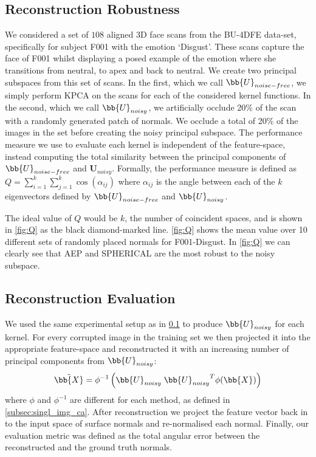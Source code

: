 \subsection{Reconstruction Robustness}\label{subsec:Q}
We considered a set of $108$ aligned 3D face scans from the BU-4DFE data-set,
specifically for subject F001 with the emotion `Disgust'. These scans capture
the face of F001 whilst displaying a posed example of the emotion where she
transitions from neutral, to apex and back to neutral. We create two principal
subspaces from this set of scans. In the first, which we call
$\bb{U}_{noise-free}$, we simply perform KPCA on the scans for each of
the considered kernel functions. In the second, which we call
$\bb{U}_{noisy}$, we artificially occlude 20\% of the scan with a
randomly generated patch of normals. We occlude a total of 20\% of the images
in the set before creating the noisy principal subspace. The performance
measure we use to evaluate each kernel is independent of the feature-space,
instead computing the total similarity between the principal components of
$\bb{U}_{noise-free}$ and $\boldsymbol{U}_{noisy}$. Formally, the
performance measure is defined as
$Q = \sum_{i=1}^k \sum_{j=1}^k \cos(\alpha_{ij})$ where $\alpha_{ij}$ is the
angle between each of the $k$ eigenvectors defined by
 $\bb{U}_{noise-free}$ and $\bb{U}_{noisy}$.

The ideal value of $Q$ would be $k$, the number of coincident spaces, and is
shown in \cref{fig:Q} as the black diamond-marked line. \cref{fig:Q}
shows the mean value over 10 different sets of randomly placed normals for
F001-Disgust. In \cref{fig:Q} we can clearly see that AEP and SPHERICAL
are the most robust to the noisy subspace.
\subsection{Reconstruction Evaluation}
We used the same experimental setup as in \cref{subsec:Q} to produce
$\bb{U}_{noisy}$ for each kernel. For every corrupted image in the
training set we then projected it into the appropriate feature-space and
reconstructed it with an increasing number of principal components from
 $\bb{U}_{noisy}$:
\begin{equation}\label{eq:xtilde}
    \tilde{\bb{X}} = \phi^{-1} \left( \bb{U}_{noisy} \; {\bb{U}_{noisy}}^T \phi(\bb{X}) \right)
\end{equation}
where $\phi$ and $\phi^{-1}$ are different for each method, as defined in
\cref{subsec:singl_img_ca}. After reconstruction we project the
feature vector back in to the input space of surface normals and re-normalised
each normal. Finally, our evaluation metric was defined as the total angular
 error between the reconstructed and the ground truth normals.

